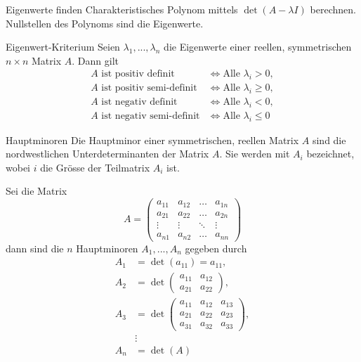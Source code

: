 \begin{Rezept}{Eigenwerte finden}{}
	Charakteristisches Polynom mittels $\det (A-\lambda I)$ berechnen. Nullstellen des Polynoms sind die Eigenwerte.
\end{Rezept}

\begin{Satz}{Eigenwert-Kriterium}{}
	Seien $\lambda_1, ..., \lambda_n$ die Eigenwerte einer reellen, symmetrischen $n \times n$ Matrix $A$. Dann gilt
	\begin{align*}
		A \text{ ist positiv definit} &\iff \text{Alle }\lambda_i > 0,\\
		A \text{ ist positiv semi-definit} &\iff \text{Alle }\lambda_i \geq 0,\\
		A \text{ ist negativ definit} &\iff \text{Alle }\lambda_i < 0,\\
		A \text{ ist negativ semi-definit} &\iff \text{Alle }\lambda_i \leq 0
	\end{align*}
\end{Satz}

\begin{Definition}{Hauptminoren}{}
	Die Hauptminor einer symmetrischen, reellen Matrix $A$ sind die nordwestlichen Unterdeterminanten der Matrix $A$. Sie werden mit $A_i$ bezeichnet, wobei $i$ die Grösse der Teilmatrix $A_i$ ist. 
	
	Sei die Matrix
	\[
		A = \begin{pmatrix}
            a_{11} & a_{12} & \hdots & a_{1n}\\
            a_{21} & a_{22} & \hdots & a_{2n}\\
            \vdots & \vdots & \ddots & \vdots\\
            a_{n1} & a_{n2} & \hdots & a_{nn}
        \end{pmatrix}
	\]
	dann sind die $n$ Hauptminoren $A_1, ..., A_n$ gegeben durch
	\begin{align*}
		A_1 &= \det(a_{11}) = a_{11},\\
		A_2 &= \det\begin{pmatrix}
            a_{11} & a_{12} \\
            a_{21} & a_{22}
            \end{pmatrix},\\
       	A_3 &= \det\begin{pmatrix}
            a_{11} & a_{12} & a_{13} \\
            a_{21} & a_{22}& a_{23}\\
            a_{31} & a_{32}& a_{33}
            \end{pmatrix},\\
            &\vdots\\
        A_n &= \det(A)
    \end{align*}
\end{Definition}

